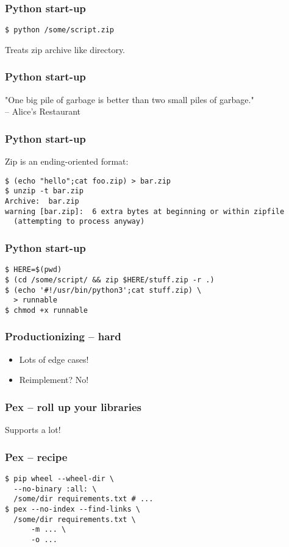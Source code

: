 \begin{frame}[fragile]
\frametitle{Python start-up}
\begin{lstlisting}
$ python /some/script.zip
\end{lstlisting}
Treats zip archive like directory.
\end{frame}

\begin{frame}[fragile]
\frametitle{Python start-up}
"One big pile of garbage is better than two small piles of garbage."\\
-- Alice's Restaurant
\end{frame}

\begin{frame}[fragile]
\frametitle{Python start-up}
Zip is an ending-oriented format:
\begin{lstlisting}
$ (echo "hello";cat foo.zip) > bar.zip
$ unzip -t bar.zip 
Archive:  bar.zip
warning [bar.zip]:  6 extra bytes at beginning or within zipfile
  (attempting to process anyway)
\end{lstlisting}
\end{frame}

\begin{frame}[fragile]
\frametitle{Python start-up}
\begin{lstlisting}
$ HERE=$(pwd)
$ (cd /some/script/ && zip $HERE/stuff.zip -r .)
$ (echo '#!/usr/bin/python3';cat stuff.zip) \
  > runnable
$ chmod +x runnable
\end{lstlisting}
\end{frame}

\begin{frame}[fragile]
\frametitle{Productionizing -- hard}
\begin{itemize}
\item Lots of edge cases!
\item Reimplement? No!
\end{itemize}
\end{frame}

\begin{frame}[fragile]
\frametitle{Pex -- roll up your libraries}
Supports a lot!
\end{frame}

\begin{frame}[fragile]
\frametitle{Pex -- recipe}
\begin{lstlisting}
$ pip wheel --wheel-dir \
  --no-binary :all: \
  /some/dir requirements.txt # ...
$ pex --no-index --find-links \
  /some/dir requirements.txt \
      -m ... \
      -o ...
\end{lstlisting}
\end{frame}

